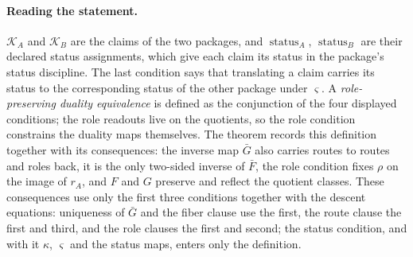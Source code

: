 \paragraph{Reading the statement.}
\(\mathcal K_A\) and \(\mathcal K_B\) are the claims of the two
packages, and \(\operatorname{status}_A\), \(\operatorname{status}_B\)
are their declared status assignments, which give each claim its
status in the package's status discipline. The last condition says
that translating a claim carries its status to the corresponding
status of the other package under \(\varsigma\). A \emph{role-preserving
duality equivalence} is defined as the conjunction of the four displayed
conditions; the role readouts live on the quotients, so the role condition
constrains the duality maps themselves. The theorem records this definition
together with its consequences: the inverse map \(\bar G\) also carries routes
to routes and roles back, it is the only two-sided inverse of \(\bar F\), the
role condition fixes \(\rho\) on the image of \(r_A\), and \(F\) and \(G\)
preserve and reflect the quotient classes. These consequences use only the first three conditions together with the descent equations: uniqueness of \(\bar G\) and the fiber clause use the first, the route clause the first and third, and the role clauses the first and second; the status condition, and with it \(\kappa\), \(\varsigma\) and the status maps, enters only the definition.

